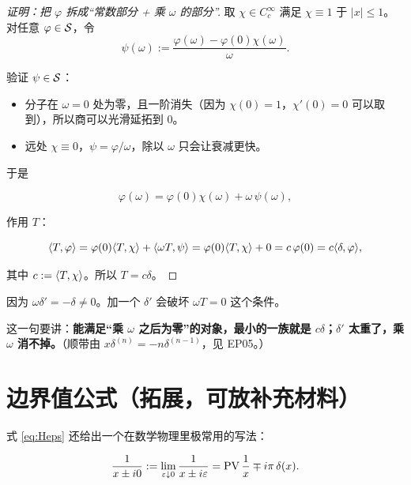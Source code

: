 \begin{proof}[证明：把 $\varphi$ 拆成“常数部分 + 乘 $\omega$ 的部分”]
取 $\chi\in C_c^{\infty}$ 满足 $\chi\equiv1$ 于 $|x|\le1$。对任意 $\varphi\in\mathcal{S}$，令
\begin{equation}
\psi(\omega):=\frac{\varphi(\omega)-\varphi(0)\chi(\omega)}{\omega}.
\end{equation}

验证 $\psi\in\mathcal{S}$：
\begin{itemize}[leftmargin=1.4em,itemsep=0.2em]
\item 分子在 $\omega=0$ 处为零，且一阶消失（因为 $\chi(0)=1$，$\chi'(0)=0$ 可以取到），所以商可以光滑延拓到 $0$。
\item 远处 $\chi\equiv0$，$\psi=\varphi/\omega$，除以 $\omega$ 只会让衰减更快。
\end{itemize}

于是

\begin{equation}
\varphi(\omega)=\varphi(0)\chi(\omega)+\omega\,\psi(\omega),
\end{equation}

作用 $T$：

\begin{equation}
\langle T,\varphi\rangle=\varphi(0)\langle T,\chi\rangle+\langle \omega T,\psi\rangle
=\varphi(0)\langle T,\chi\rangle+0
=c\,\varphi(0)=c\langle \delta,\varphi\rangle,
\end{equation}

其中 $c:=\langle T,\chi\rangle$。所以 $T=c\delta$。
\end{proof}

\begin{warnbox}
因为 $\omega\delta'=-\delta\neq0$。加一个 $\delta'$ 会破坏 $\omega T=0$ 这个条件。

这一句要讲：\textbf{能满足“乘 $\omega$ 之后为零”的对象，最小的一族就是 $c\delta$；$\delta'$ 太重了，乘 $\omega$ 消不掉。}（顺带由 $x\delta^{(n)}=-n\delta^{(n-1)}$，见 EP05。）
\end{warnbox}

\section{边界值公式（拓展，可放补充材料）}

式 \eqref{eq:Heps} 还给出一个在数学物理里极常用的写法：

\begin{equation}
\frac{1}{x\pm i0}:=\lim_{\varepsilon\downarrow0}\frac{1}{x\pm i\varepsilon}
=\operatorname{PV}\frac{1}{x}\mp i\pi\,\delta(x).\label{eq:boundary}
\end{equation}

